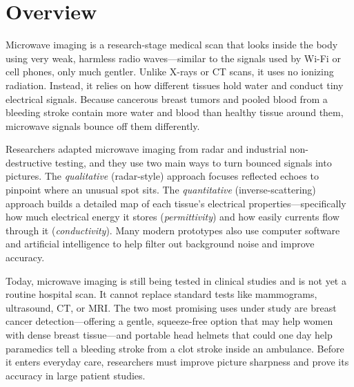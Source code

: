\label{ch:infographic-microwave-imaging}

\section{Overview}

Microwave imaging is a research-stage medical scan that looks inside the body using very weak, harmless radio waves---similar to the signals used by Wi-Fi or cell phones, only much gentler. Unlike X-rays or CT scans, it uses no ionizing radiation. Instead, it relies on how different tissues hold water and conduct tiny electrical signals. Because cancerous breast tumors and pooled blood from a bleeding stroke contain more water and blood than healthy tissue around them, microwave signals bounce off them differently.

Researchers adapted microwave imaging from radar and industrial non-destructive testing, and they use two main ways to turn bounced signals into pictures. The \emph{qualitative} (radar-style) approach focuses reflected echoes to pinpoint where an unusual spot sits. The \emph{quantitative} (inverse-scattering) approach builds a detailed map of each tissue's electrical properties---specifically how much electrical energy it stores (\emph{permittivity}) and how easily currents flow through it (\emph{conductivity}). Many modern prototypes also use computer software and artificial intelligence to help filter out background noise and improve accuracy.

Today, microwave imaging is still being tested in clinical studies and is not yet a routine hospital scan. It cannot replace standard tests like mammograms, ultrasound, CT, or MRI. The two most promising uses under study are breast cancer detection---offering a gentle, squeeze-free option that may help women with dense breast tissue---and portable head helmets that could one day help paramedics tell a bleeding stroke from a clot stroke inside an ambulance. Before it enters everyday care, researchers must improve picture sharpness and prove its accuracy in large patient studies.

